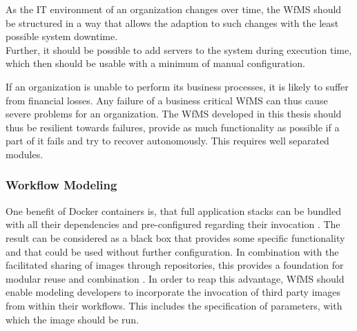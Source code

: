       As the IT environment of an organization changes over time, %
      the \ac{WfMS} should be structured in a way that allows the adaption to such changes with the least possible system downtime. \\
      Further, it should be possible to add servers to the system during execution time, which then should be usable with a minimum of manual configuration.

      If an organization is unable to perform its business processes, it is likely to suffer from financial losses. Any failure of a business critical \ac{WfMS} can thus cause severe problems for an organization. The \ac{WfMS} developed in this thesis should thus be resilient towards failures, \ie provide as much functionality as possible if a part of it fails and try to recover autonomously. This requires well separated modules.



  \subsubsection{Workflow Modeling} %
    \label{ssub:workflow_modeling}

      One benefit of Docker containers is, that full application stacks can be bundled with all their dependencies and pre-configured regarding their invocation \cite[p.~82]{Bernstein2014Containers}. The result can be considered as a black box that provides some specific functionality and that could be used without further configuration. In combination with the facilitated sharing of images through repositories, this provides a foundation for modular reuse and combination \cite[p.~6]{Boettiger2015Introduction}.
      In order to reap this advantage, \ac{WfMS} should enable modeling developers to incorporate the invocation of third party images from within their workflows. This includes the specification of parameters, with which the image should be run.


